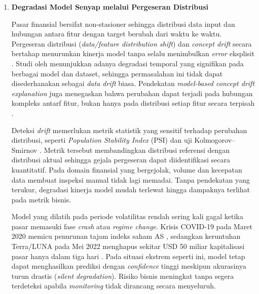 \begin{enumerate}
    \vspace{0.5em}

    \item \textbf{Degradasi Model Senyap melalui Pergeseran Distribusi}
    
    Pasar finansial bersifat non-stasioner sehingga distribusi data input dan hubungan antara fitur dengan target berubah dari waktu ke waktu. Pergeseran distribusi (\textit{data/feature distribution shift}) dan \textit{concept drift} secara bertahap menurunkan kinerja model tanpa selalu menimbulkan \textit{error} eksplisit \autocite{lu2019learning}. Studi oleh \textcite{vela2022temporal} menunjukkan adanya degradasi temporal yang signifikan pada berbagai model dan dataset, sehingga permasalahan ini tidak dapat disederhanakan sebagai \textit{data drift} biasa. Pendekatan \textit{model-based concept drift explanation} juga menegaskan bahwa perubahan dapat terjadi pada hubungan kompleks antarf fitur, bukan hanya pada distribusi setiap fitur secara terpisah \autocite{hinder2023model}.
    
    \vspace{0.5em}

    Deteksi \textit{drift} memerlukan metrik statistik yang sensitif terhadap perubahan distribusi, seperti \textit{Population Stability Index} (PSI) dan uji Kolmogorov--Smirnov \autocite{cespedes2024efficient}. Metrik tersebut membandingkan distribusi referensi dengan distribusi aktual sehingga gejala pergeseran dapat diidentifikasi secara kuantitatif. Pada domain finansial yang bergejolak, volume dan kecepatan data membuat inspeksi manual tidak lagi memadai. Tanpa pendekatan yang terukur, degradasi kinerja model mudah terlewat hingga dampaknya terlihat pada metrik bisnis.
    
    \vspace{0.5em}

    Model yang dilatih pada periode volatilitas rendah sering kali gagal ketika pasar memasuki fase \textit{crash} atau \textit{regime change}. Krisis COVID-19 pada Maret 2020 memicu penurunan tajam indeks saham AS \autocite{mazur2021covid}, sedangkan keruntuhan Terra/LUNA pada Mei 2022 menghapus sekitar USD 50 miliar kapitalisasi pasar hanya dalam tiga hari \autocite{liu2023anatomy}. Pada situasi ekstrem seperti ini, model tetap dapat menghasilkan prediksi dengan \textit{confidence} tinggi meskipun akurasinya turun drastis (\textit{silent degradation}). Risiko bisnis meningkat tanpa segera terdeteksi apabila \textit{monitoring} tidak dirancang secara menyeluruh.
    

\end{enumerate}
